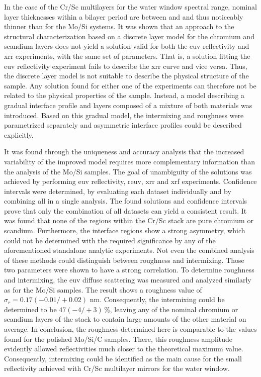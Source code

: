 In the case of the Cr/Sc multilayers for the water window spectral range,
nominal layer thicknesses within a bilayer period are between  and
 and thus noticeably thinner than for the Mo/Si systems.
It was shown that an approach to the structural characterization based on a
discrete layer model for the chromium and scandium layers does not yield a
solution valid for both the \gls{euv} reflectivity and \gls{xrr} experiments,
with the same set of parameters.
That is, a solution fitting the \gls{euv} reflectivity experiment fails to
describe the \gls{xrr} curve and vice versa.
Thus, the discrete layer model is not suitable to describe the physical
structure of the sample.
Any solution found for either one of the experiments can therefore not be
related to the physical properties of the sample.
Instead, a model describing a gradual interface profile and layers composed of a
mixture of both materials was introduced.
Based on this gradual model, the intermixing and roughness were parametrized
separately and asymmetric interface profiles could be described explicitly.

It was found through the uniqueness and accuracy analysis that the increased
variability of the improved model requires more complementary information than
the analysis of the Mo/Si samples.
The goal of unambiguity of the solutions was achieved by performing \gls{euv}
reflectivity, \gls{reuv}, \gls{xrr} and \gls{xrf} experiments.
Confidence intervals were determined, by evaluating each dataset individually
and by combining all in a single analysis.
The found solutions and confidence intervals prove that only the combination of
all datasets can yield a consistent result.
It was found that none of the regions within the Cr/Sc stack are pure chromium
or scandium.
Furthermore, the interface regions show a strong asymmetry, which could not be
determined with the required significance by any of the aforementioned
standalone analytic experiments.
Not even the combined analysis of these methods could distinguish between
roughness and intermixing.
Those two parameters were shown to have a strong correlation.
To determine roughness and intermixing, the \gls{euv} diffuse scattering was
measured and analyzed similarly as for the Mo/Si samples.
The result shows a roughness value of $\sigma_r = 0.17  (-0.01/+0.02)$ nm.
Consequently, the intermixing could be determined to be $47 (-4/+3)\, \%$,
leaving any of the nominal chromium or scandium layers of the stack to contain
large amounts of the other material on average.
In conclusion, the roughness determined here is comparable to the values found
for the polished Mo/Si/C samples.
There, this roughness amplitude evidently allowed reflectivities much closer to
the theoretical maximum value.
Consequently, intermixing could be identified  as the main cause for the small
reflectivity achieved with Cr/Sc multilayer mirrors for the water window.

